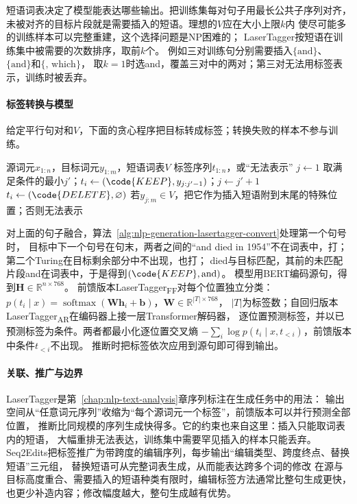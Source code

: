 短语词表决定了模型能表达哪些输出。把训练集每对句子用最长公共子序列对齐，
未被对齐的目标片段就是需要插入的短语。理想的$V$应在大小上限$k$内
使尽可能多的训练样本可以完整重建，这个选择问题是NP困难的；
LaserTagger按短语在训练集中被需要的次数排序，取前$k$个。
例如三对训练句分别需要插入$\{\text{and}\}$、$\{\text{and}\}$和$\{\text{, which}\}$，
取$k=1$时选and，覆盖三对中的两对；第三对无法用标签表示，训练时被丢弃。

\paragraph{标签转换与模型}
给定平行句对和$V$，下面的贪心程序把目标转成标签；转换失败的样本不参与训练。

\begin{algorithm}[LaserTagger的标签转换]
  \label{alg:nlp-generation-lasertagger-convert}
  \begin{algorithmic}[1]
    \Require 源词元$x_{1:n}$，目标词元$y_{1:m}$，短语词表$V$
    \Ensure 标签序列$t_{1:n}$，或“无法表示”
    \State $j\gets1$
        \State 取满足条件的最小$j'$；$t_i\gets(\code{KEEP},y_{j:j'-1})$；$j\gets j'+1$
      \Else
        \State $t_i\gets(\code{DELETE},\varnothing)$
      \EndIf
    \EndFor
      \State 若$y_{j:m}\in V$，把它作为插入短语附到末尾的特殊位置；否则\Return 无法表示
    \EndIf
  \end{algorithmic}
\end{algorithm}

对上面的句子融合，算法~\ref{alg:nlp-generation-lasertagger-convert}处理第一个句号时，
目标中下一个句号在句末，两者之间的“and died in 1954”不在词表中，打；第二个Turing在目标剩余部分中不出现，也打；
died与目标匹配，其前的未匹配片段and在词表中，于是得到$(\code{KEEP},\text{and})$。
模型用BERT编码源句，得到$\bm H\in\mathbb{R}^{n\times768}$。
前馈版本LaserTagger\textsubscript{FF}对每个位置独立分类：
$p(t_i\mid x)=\operatorname{softmax}(\bm W\bm h_i+\bm b)$，$\bm W\in\mathbb{R}^{|T|\times768}$，
$|T|$为标签数；自回归版本LaserTagger\textsubscript{AR}在编码器上接一层Transformer解码器，
逐位置预测标签，并以已预测标签为条件。两者都最小化逐位置交叉熵
$-\sum_{i}\log p(t_i\mid x,t_{<i})$，前馈版本中条件$t_{<i}$不出现。
推断时把标签依次应用到源句即可得到输出。

\paragraph{关联、推广与边界}
LaserTagger是第~\ref{chap:nlp-text-analysis}章序列标注在生成任务中的用法：
输出空间从“任意词元序列”收缩为“每个源词元一个标签”，前馈版本可以并行预测全部位置，
推断比同规模的序列生成快得多。它的约束也来自这里：插入只能取词表内的短语，
大幅重排无法表达，训练集中需要罕见插入的样本只能丢弃。
Seq2Edits把标签推广为带跨度的编辑序列，每步输出“编辑类型、跨度终点、替换短语”三元组，
替换短语可从完整词表生成，从而能表达跨多个词的修改
在源与目标高度重合、需要插入的短语种类有限时，编辑标签方法通常比整句生成更快，
也更少补造内容；修改幅度越大，整句生成越有优势。

